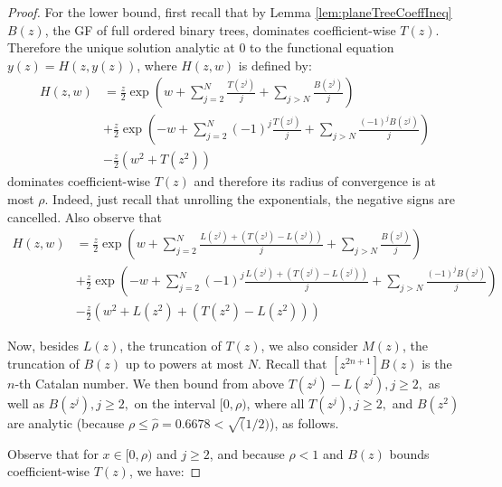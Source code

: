 \documentclass{amsart}
\theoremstyle{plain}
\newcommand{\nicetrees}{T}
\begin{document}
\begin{proof}
For the lower bound, first recall that
by Lemma \ref{lem:planeTreeCoeffIneq}     $B(z)$, the GF of full ordered binary trees, dominates coefficient-wise $T(z)$. Therefore the unique solution analytic at $0$ to the functional equation $y(z) = H(z, y(z))$, where  $H(z,w)$ is defined by: 
\begin{equation}\label{eq:upperBoundingSystem}
\begin{split}
    H(z,w) &=  \frac{z}{2} 
        \exp\left( w + \sum\limits_{j = 2}^{N} \frac{\nicetrees(z^j)}{j} 
        + \sum\limits_{j > N} \frac{B(z^j)}{j} \right)  \\ 
      &+\frac{z}{2}\exp\left(-w + \sum\limits_{j = 2}^{N} (-1)^j \frac{\nicetrees(z^j)}{j} 
      + \sum\limits_{j > N} \frac{(-1)^j B(z^j)}{j} \right) \\&
       -\frac{z}{2}\left(w^2 + T(z^2) \right)
\end{split}
\end{equation}
dominates coefficient-wise $\nicetrees(z)$ and therefore its radius of convergence is at most $\rho$. Indeed, just recall that unrolling the exponentials, the negative signs are cancelled.  Also observe that 
\begin{equation}\label{eq:upperBoundingSystem2}
\begin{split}
    H(z,w) &=  \frac{z}{2} 
        \exp\left( w + \sum\limits_{j = 2}^{N} \frac{L(z^j) +(T(z^j) - L(z^j))}{j}
        + \sum\limits_{j > N} \frac{B(z^j)}{j} \right)  \\ 
      &+\frac{z}{2}\exp\left(-w + \sum\limits_{j = 2}^{N} (-1)^j \frac{L(z^j) +(T(z^j) - L(z^j))}{j} 
      + \sum\limits_{j > N} \frac{(-1)^j B(z^j)}{j} \right) \\
      &-\frac{z}{2}\left(w^2 + L(z^2) +(T(z^2) - L(z^2))\right)
\end{split}
\end{equation}
 
Now, besides $L(z)$, the truncation of $T(z)$,  we also consider $M(z)$, the truncation of $B(z)$ up to powers at most $N$. Recall that $[z^{2n+1}]B(z)$ is the $n$-th Catalan number. 
We then  bound from above  
$\nicetrees(z^j) - L(z^j), j\geq 2,$  as well as $B(z^j),j \geq 2,$
 on the  interval $[0,\rho)$,  where all  $\nicetrees(z^j), j\geq 2,$ and $B(z^2)$ are analytic (because $\rho \leq  \hat{\rho} =  0.6678 < \sqrt(1/2)$), as follows.  

Observe that for $x \in [0,\rho)$ and $j\geq 2$, and because $\rho <1$ and  $B(z)$ bounds coefficient-wise $T(z)$, we have:


\end{proof}
\end{document}
